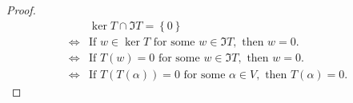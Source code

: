 \begin{proof}
    \begin{align*}
        &\ker T \cap \Im T = \left\{ 0 \right\} \\
        \iff &\text{If } w \in \ker T \text{ for some } w \in \Im T, \text{ then } w = 0. \\
        \iff &\text{If } T(w) = 0 \text{ for some } w \in \Im T, \text{ then } w = 0. \\
        \iff &\text{If } T(T(\alpha )) = 0 \text{ for some } \alpha \in V, \text{ then } T(\alpha ) = 0.   
    \end{align*}    
\end{proof}
